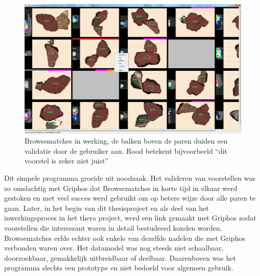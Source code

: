 \begin{figure}[ht]
	\begin{center}
		\includegraphics[width=.8\columnwidth]{images/browsematches-01-cut.png}
		\caption{Browsematches in werking, de balken boven de paren duiden een validatie door de gebruiker aan. Rood betekent bijvoorbeeld ``dit voorstel is zeker niet juist''}
	\end{center}
\end{figure}

Dit simpele programma groeide uit noodzaak. Het valideren van voorstellen was zo omslachtig met Griphos dat Browsematches in korte tijd in elkaar werd gestoken en met veel succes werd gebruikt om op betere wijze door alle paren te gaan. Later, in het begin van dit thesisproject en als deel van het inwerkingsproces in het thera project, werd een link gemaakt met Griphos zodat voorstellen die interessant waren in detail bestudeerd konden worden. Browsematches erfde echter ook enkele van dezelfde nadelen die met Griphos verbonden waren over. Het datamodel was nog steeds niet schaalbaar, doorzoekbaar, gemakkelijk uitbreidbaar of deelbaar. Daarenboven was het programma slechts een prototype en niet bedoeld voor algemeen gebruik.

